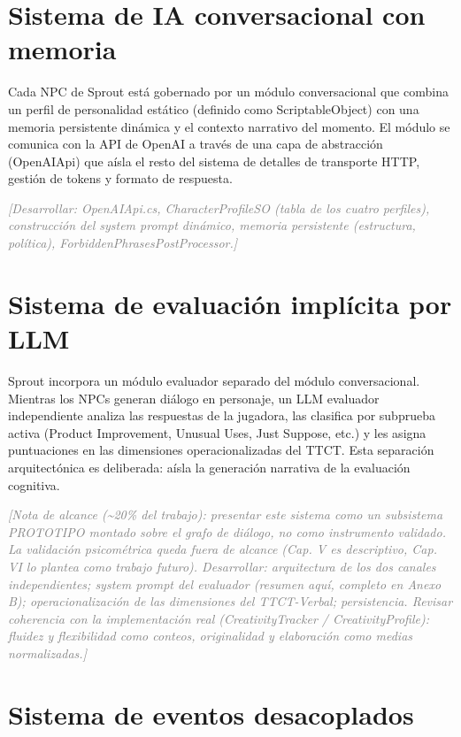 \documentclass[12pt,twoside,titlepage]{report}
\begin{document}
\section{Sistema de IA conversacional con memoria}

Cada NPC de Sprout está gobernado por un módulo conversacional que combina un perfil de personalidad estático (definido como ScriptableObject) con una memoria persistente dinámica y el contexto narrativo del momento. El módulo se comunica con la API de OpenAI a través de una capa de abstracción (OpenAIApi) que aísla el resto del sistema de detalles de transporte HTTP, gestión de tokens y formato de respuesta.

\textcolor{gray}{\textit{[Desarrollar: OpenAIApi.cs, CharacterProfileSO (tabla de los cuatro perfiles), construcción del system prompt dinámico, memoria persistente (estructura, política), ForbiddenPhrasesPostProcessor.]}}

\section{Sistema de evaluación implícita por LLM}

Sprout incorpora un módulo evaluador separado del módulo conversacional. Mientras los NPCs generan diálogo en personaje, un LLM evaluador independiente analiza las respuestas de la jugadora, las clasifica por subprueba activa (Product Improvement, Unusual Uses, Just Suppose, etc.) y les asigna puntuaciones en las dimensiones operacionalizadas del TTCT. Esta separación arquitectónica es deliberada: aísla la generación narrativa de la evaluación cognitiva.

\textcolor{gray}{\textit{[Nota de alcance (\textasciitilde{}20\% del trabajo): presentar este sistema como un subsistema PROTOTIPO montado sobre el grafo de diálogo, no como instrumento validado. La validación psicométrica queda fuera de alcance (Cap. V es descriptivo, Cap. VI lo plantea como trabajo futuro). Desarrollar: arquitectura de los dos canales independientes; system prompt del evaluador (resumen aquí, completo en Anexo B); operacionalización de las dimensiones del TTCT-Verbal; persistencia. Revisar coherencia con la implementación real (CreativityTracker / CreativityProfile): fluidez y flexibilidad como conteos, originalidad y elaboración como medias normalizadas.]}}

\section{Sistema de eventos desacoplados}
\end{document}
